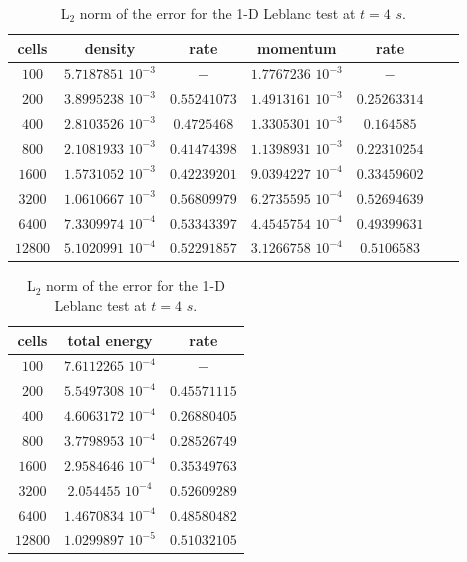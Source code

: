 %
\begin{table}[H]
\begin{center}
 \caption{\label{tbl:l2_norm_leblanc} L$_2$ norm of the error for the 1-D Leblanc test at $t=4$ $s$.}
 \begin{tabular}{|c|c|c|c|c|c|c|}
 \hline
   cells & density & rate & momentum & rate \\ \hline
$100$ &   $5.7187851$ $10^{-3}$ & $-$ & $1.7767236$ $10^{-3}$ & $-$ \\ \hline
$200$  &  $3.8995238$ $10^{-3}$ & $0.55241073$ & $1.4913161$ $10^{-3}$ & $0.25263314$ \\ \hline
$400$ & $2.8103526$ $10^{-3}$   & $0.4725468$ & $1.3305301$ $10^{-3}$ & $0.164585$ \\ \hline
$800$ & $2.1081933$ $10^{-3}$   & $0.41474398$ & $1.1398931$ $10^{-3}$ & $0.22310254$ \\ \hline
$1600$ & $1.5731052$ $10^{-3}$  & $0.42239201$ & $9.0394227$ $10^{-4}$ & $0.33459602$ \\ \hline
$3200$&$1.0610667$ $10^{-3}$    & $0.56809979$ & $6.2735595$ $10^{-4}$ & $0.52694639$ \\ \hline
$6400$&$7.3309974$ $10^{-4}$    & $0.53343397$ & $4.4545754$ $10^{-4}$ & $0.49399631$ \\ \hline
 $12800$&$5.1020991$ $10^{-4}$  & $0.52291857$ & $3.1266758$ $10^{-4}$ & $0.5106583$ \\ \hline
\end{tabular}
\begin{tabular}{|c|c|c|}
\hline
cells & total energy & rate \\ \hline
$100$ & $7.6112265$  $10^{-4}$& $-$\\   \hline
$200$ & $5.5497308$ $10^{-4}$& $0.45571115$\\ \hline
$400$ & $4.6063172$ $10^{-4}$ & $0.26880405$\\ \hline
$800$ & $3.7798953$ $10^{-4}$ & $0.28526749$\\ \hline
$1600$ & $2.9584646$ $10^{-4}$ & $0.35349763$\\ \hline
$3200$ & $2.054455$ $10^{-4}$ & $0.52609289$\\ \hline
$6400$ & $1.4670834$ $10^{-4}$ & $0.48580482$\\ \hline
$12800$ & $1.0299897$ $10^{-5}$ & $0.51032105$\\  \hline
\end{tabular}
\end{center}
\end{table}

